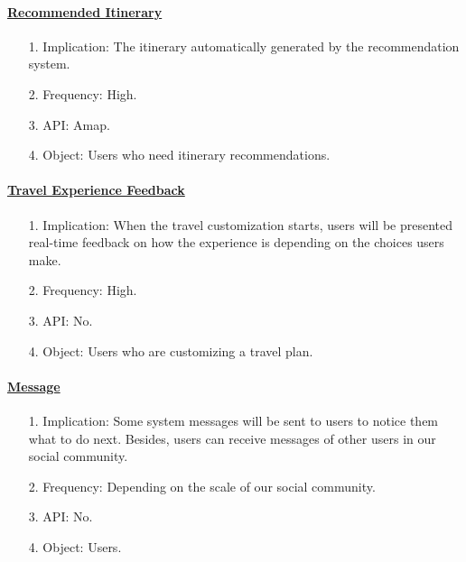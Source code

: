 \documentclass[10pt]{article}
\begin{document}
\paragraph{\underline{Recommended Itinerary}}
\begin{itemize}
  \item[1.] Implication: The itinerary automatically generated by the recommendation system.
  \item[2.] Frequency: High.
  \item[3.] API: Amap.  
  \item[4.] Object: Users who need itinerary recommendations. 
\end{itemize}

\paragraph{\underline{Travel Experience Feedback}}
\begin{itemize}
  \item[1.] Implication: When the travel customization starts, users will be presented real-time feedback on how the experience is depending on the choices users make.
  \item[2.] Frequency: High.
  \item[3.] API: No.  
  \item[4.] Object: Users who are customizing a travel plan. 
\end{itemize}

\paragraph{\underline{Message}}
\begin{itemize}
  \item[1.] Implication: Some system messages will be sent to users to notice them what to do next. Besides, users can receive messages of other users in our social community.
  \item[2.] Frequency: Depending on the scale of our social community. 
  \item[3.] API: No. 
  \item[4.] Object: Users. 
\end{itemize}
\end{document}
